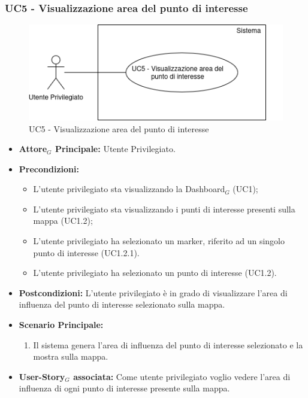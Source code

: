 \documentclass[11pt]{article}
\begin{document}
\begin{justify}
\subsubsection{\textbf{UC5 - Visualizzazione area del punto di interesse}}
\begin{figure}[H]
    \centering
    \includegraphics[width=0.7\linewidth]{UC5image.png}
    \caption{UC5 - Visualizzazione area del punto di interesse}
    \label{fig:UC5}
\end{figure}
\begin{itemize}
     \item \textbf{Attore$_G$ Principale:} Utente Privilegiato.
     \item \textbf{Precondizioni:}
        \begin{itemize}
    		\item L'utente privilegiato sta visualizzando la Dashboard$_G$ (UC1);
    	        \item L'utente privilegiato sta visualizzando i punti di interesse presenti sulla mappa (UC1.2);
    	        \item L'utente privilegiato ha selezionato un marker, riferito ad un singolo punto di interesse (UC1.2.1).
            \item L'utente privilegiato ha selezionato un punto di interesse (UC1.2).
        \end{itemize}
     \item \textbf{Postcondizioni:} L'utente privilegiato è in grado di visualizzare l'area di influenza del punto di interesse selezionato sulla mappa.
     \item \textbf{Scenario Principale:}
        \begin{enumerate}
            \item Il sistema genera l'area di influenza del punto di interesse selezionato e la mostra sulla mappa.
        \end{enumerate}
     \item \textbf{User-Story$_G$ associata:}
     Come utente privilegiato voglio vedere l'area di influenza di ogni punto di interesse presente sulla mappa.
\end{itemize}


\end{justify}
\end{document}
